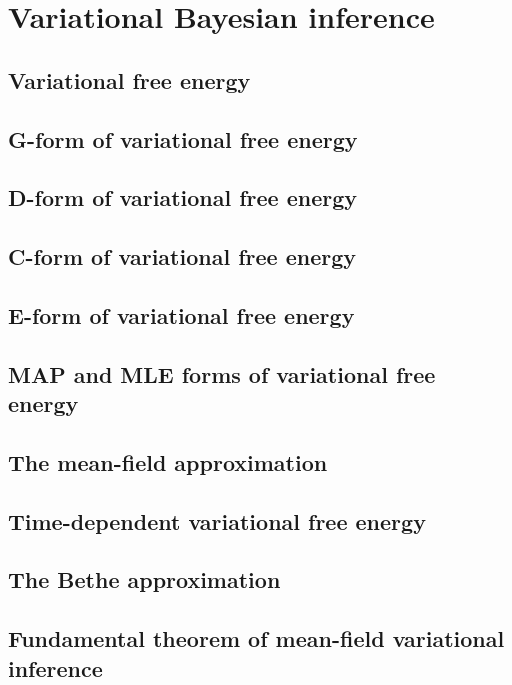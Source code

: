 \chapter{Variational Bayesian inference}

\section{Variational free energy}
\section{G-form of variational free energy}
\section{D-form of variational free energy}
\section{C-form of variational free energy}
\section{E-form of variational free energy}
\section{MAP and MLE forms of variational free energy}
\section{The mean-field approximation}
\section{Time-dependent variational free energy}
\section{The Bethe approximation}
\section{Fundamental theorem of mean-field variational inference}
